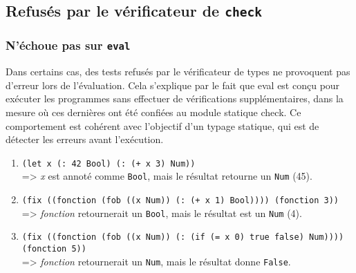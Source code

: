 \documentclass[a4paper,12pt]{article}
\begin{document}
    \subsection{Refusés par le vérificateur de \texttt{check}}
        \subsubsection{N'échoue pas sur \texttt{eval}}
        Dans certains cas, des tests refusés par le vérificateur de types ne provoquent pas d'erreur 
        lors de l'évaluation. Cela s'explique par le fait que eval est conçu pour exécuter les programmes 
        sans effectuer de vérifications supplémentaires, dans la mesure où ces dernières ont été confiées 
        au module statique check. Ce comportement est cohérent avec l'objectif d'un typage statique, qui est de 
        détecter les erreurs avant l'exécution. \\


        \begin{enumerate}
            \item \texttt{(let x (: 42 Bool) (: (+ x 3) Num))} \\[.5em]
            => \textit{x} est annoté comme \texttt{Bool}, mais le résultat retourne un \texttt{Num} (45).
        
            \item \texttt{(fix ((fonction (fob ((x Num)) (: (+ x 1) Bool)))) (fonction 3))} \\[.5em]
            => \textit{fonction} retournerait un \texttt{Bool}, mais le résultat est un \texttt{Num} (4).
        
            \item \texttt{(fix ((fonction (fob ((x Num)) (: (if (= x 0) true false) Num)))) (fonction 5))} \\[.5em]
            => \textit{fonction} retournerait un \texttt{Num}, mais le résultat donne \texttt{False}.
        \end{enumerate}
\end{document}

